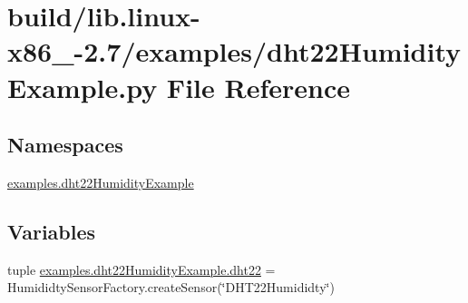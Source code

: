 \hypertarget{build_2lib_8linux-x86__64-2_87_2examples_2dht22HumidityExample_8py}{}\section{build/lib.linux-\/x86\+\_-\/2.7/examples/dht22\+Humidity\+Example.py File Reference}
\label{build_2lib_8linux-x86__64-2_87_2examples_2dht22HumidityExample_8py}
\subsection*{Namespaces}
\begin{DoxyCompactItemize}
\item 
 \hyperlink{namespaceexamples_1_1dht22HumidityExample}{examples.\+dht22\+Humidity\+Example}
\end{DoxyCompactItemize}
\subsection*{Variables}
\begin{DoxyCompactItemize}
\item 
tuple \hyperlink{namespaceexamples_1_1dht22HumidityExample_ab51d647bfea728dc90a3674a0401cedb}{examples.\+dht22\+Humidity\+Example.\+dht22} = Humididty\+Sensor\+Factory.\+create\+Sensor(\char`\"{}D\+H\+T22\+Humididty\char`\"{})
\end{DoxyCompactItemize}

